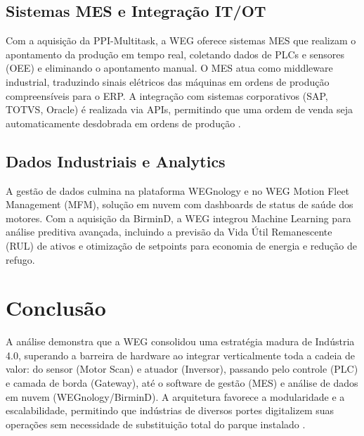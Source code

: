 \documentclass[12pt,a4paper,oneside]{article}
\begin{document}
\subsection{Sistemas MES e Integração IT/OT}

Com a aquisição da PPI-Multitask, a WEG oferece sistemas MES que realizam o apontamento da produção em tempo real, coletando dados de PLCs e sensores (OEE) e eliminando o apontamento manual. O MES atua como middleware industrial, traduzindo sinais elétricos das máquinas em ordens de produção compreensíveis para o ERP. A integração com sistemas corporativos (SAP, TOTVS, Oracle) é realizada via APIs, permitindo que uma ordem de venda seja automaticamente desdobrada em ordens de produção \cite{caiçara2015}.

\subsection{Dados Industriais e Analytics}

A gestão de dados culmina na plataforma WEGnology e no WEG Motion Fleet Management (MFM), solução em nuvem com dashboards de status de saúde dos motores. Com a aquisição da BirminD, a WEG integrou Machine Learning para análise preditiva avançada, incluindo a previsão da Vida Útil Remanescente (RUL) de ativos e otimização de setpoints para economia de energia e redução de refugo.

\section{Conclusão}

A análise demonstra que a WEG consolidou uma estratégia madura de Indústria 4.0, superando a barreira de hardware ao integrar verticalmente toda a cadeia de valor: do sensor (Motor Scan) e atuador (Inversor), passando pelo controle (PLC) e camada de borda (Gateway), até o software de gestão (MES) e análise de dados em nuvem (WEGnology/BirminD). A arquitetura favorece a modularidade e a escalabilidade, permitindo que indústrias de diversos portes digitalizem suas operações sem necessidade de substituição total do parque instalado \cite{santos2024}.



\end{document}

